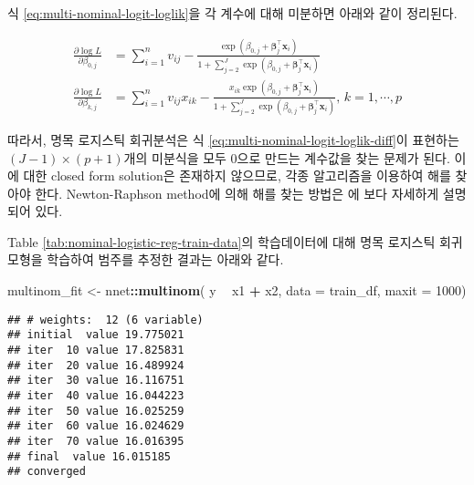 \documentclass[]{book}
\newenvironment{Shaded}{\begin{snugshade}}{\end{snugshade}}
\newcommand{\DataTypeTok}[1]{\textcolor[rgb]{0.13,0.29,0.53}{#1}}
\newcommand{\DecValTok}[1]{\textcolor[rgb]{0.00,0.00,0.81}{#1}}
\newcommand{\KeywordTok}[1]{\textcolor[rgb]{0.13,0.29,0.53}{\textbf{#1}}}
\newcommand{\NormalTok}[1]{#1}
\newcommand{\OperatorTok}[1]{\textcolor[rgb]{0.81,0.36,0.00}{\textbf{#1}}}
\newcommand{\StringTok}[1]{\textcolor[rgb]{0.31,0.60,0.02}{#1}}
\begin{document}
식 \eqref{eq:multi-nominal-logit-loglik}을 각 계수에 대해 미분하면 아래와 같이 정리된다.

\begin{equation}
\begin{split}
\frac{\partial \log L}{\partial \beta_{0,j}} &= \sum_{i = 1}^{n} v_{ij} - \frac{\exp \left( \beta_{0,j} + \boldsymbol\beta_{j}^\top \mathbf{x}_i \right)}{1 + \sum_{j = 2}^{J} \exp \left( \beta_{0,j} + \boldsymbol\beta_{j}^\top \mathbf{x}_i \right)}\\
\frac{\partial \log L}{\partial \beta_{k,j}} &= \sum_{i = 1}^{n} v_{ij} x_{ik} - \frac{x_{ik} \exp \left( \beta_{0,j} + \boldsymbol\beta_{j}^\top \mathbf{x}_i \right)}{1 + \sum_{j = 2}^{J} \exp \left( \beta_{0,j} + \boldsymbol\beta_{j}^\top \mathbf{x}_i \right)}, \, k = 1, \cdots, p
\end{split}
\label{eq:multi-nominal-logit-loglik-diff}
\end{equation}

따라서, 명목 로지스틱 회귀분석은 식 \eqref{eq:multi-nominal-logit-loglik-diff}이 표현하는 \((J - 1) \times (p + 1)\)개의 미분식을 모두 0으로 만드는 계수값을 찾는 문제가 된다. 이에 대한 closed form solution은 존재하지 않으므로, 각종 알고리즘을 이용하여 해를 찾아야 한다. Newton-Raphson method에 의해 해를 찾는 방법은 \citet{czepiel2002maximum} 에 보다 자세하게 설명되어 있다.

Table \ref{tab:nominal-logistic-reg-train-data}의 학습데이터에 대해 명목 로지스틱 회귀모형을 학습하여 범주를 추정한 결과는 아래와 같다.

\begin{Shaded}
\begin{Highlighting}[]
\NormalTok{multinom_fit <-}\StringTok{ }\NormalTok{nnet}\OperatorTok{::}\KeywordTok{multinom}\NormalTok{(}
\NormalTok{  y }\OperatorTok{~}\StringTok{ }\NormalTok{x1 }\OperatorTok{+}\StringTok{ }\NormalTok{x2, }
  \DataTypeTok{data =}\NormalTok{ train_df, }
  \DataTypeTok{maxit =} \DecValTok{1000}\NormalTok{)}
\end{Highlighting}
\end{Shaded}

\begin{verbatim}
## # weights:  12 (6 variable)
## initial  value 19.775021 
## iter  10 value 17.825831
## iter  20 value 16.489924
## iter  30 value 16.116751
## iter  40 value 16.044223
## iter  50 value 16.025259
## iter  60 value 16.024629
## iter  70 value 16.016395
## final  value 16.015185 
## converged
\end{verbatim}
\end{document}
